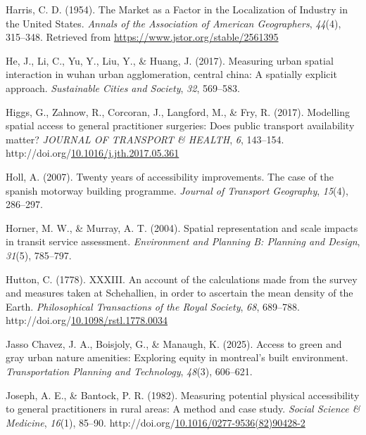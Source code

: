 \documentclass[
11pt, %
oneside, %
english, %
singlespacing, %
]{macthesis} %
\newlength{\cslhangindent}
\newenvironment{CSLReferences}[2] %
{\begin{list}{}{%
	\setlength{\itemindent}{0pt}
	\setlength{\leftmargin}{0pt}
	\setlength{\parsep}{0pt}
	\ifodd #1
	\setlength{\leftmargin}{\cslhangindent}
	\setlength{\itemindent}{-1\cslhangindent}
	\fi
	\setlength{\itemsep}{#2\baselineskip}}}
{\end{list}}
\begin{document}
\begin{CSLReferences}{1}{0}
Harris, C. D. (1954). The {Market} as a {Factor} in the {Localization} of {Industry} in the {United} {States}. \emph{Annals of the Association of American Geographers}, \emph{44}(4), 315--348. Retrieved from \url{https://www.jstor.org/stable/2561395}

He, J., Li, C., Yu, Y., Liu, Y., \& Huang, J. (2017). Measuring urban spatial interaction in wuhan urban agglomeration, central china: A spatially explicit approach. \emph{Sustainable Cities and Society}, \emph{32}, 569--583.

Higgs, G., Zahnow, R., Corcoran, J., Langford, M., \& Fry, R. (2017). Modelling spatial access to general practitioner surgeries: Does public transport availability matter? \emph{{JOURNAL} {OF} {TRANSPORT} \& {HEALTH}}, \emph{6}, 143--154. http://doi.org/\href{https://doi.org/10.1016/j.jth.2017.05.361}{10.1016/j.jth.2017.05.361}

Holl, A. (2007). Twenty years of accessibility improvements. The case of the spanish motorway building programme. \emph{Journal of Transport Geography}, \emph{15}(4), 286--297.

Horner, M. W., \& Murray, A. T. (2004). Spatial representation and scale impacts in transit service assessment. \emph{Environment and Planning B: Planning and Design}, \emph{31}(5), 785--797.

Hutton, C. (1778). {XXXIII}. {An} account of the calculations made from the survey and measures taken at {Schehallien}, in order to ascertain the mean density of the {Earth}. \emph{Philosophical Transactions of the Royal Society}, \emph{68}, 689--788. http://doi.org/\href{https://doi.org/10.1098/rstl.1778.0034}{10.1098/rstl.1778.0034}

Jasso Chavez, J. A., Boisjoly, G., \& Manaugh, K. (2025). Access to green and gray urban nature amenities: Exploring equity in montreal's built environment. \emph{Transportation Planning and Technology}, \emph{48}(3), 606--621.

Joseph, A. E., \& Bantock, P. R. (1982). Measuring potential physical accessibility to general practitioners in rural areas: A method and case study. \emph{Social Science \& Medicine}, \emph{16}(1), 85--90. http://doi.org/\href{https://doi.org/10.1016/0277-9536(82)90428-2}{10.1016/0277-9536(82)90428-2}


\end{CSLReferences}
\end{document}
